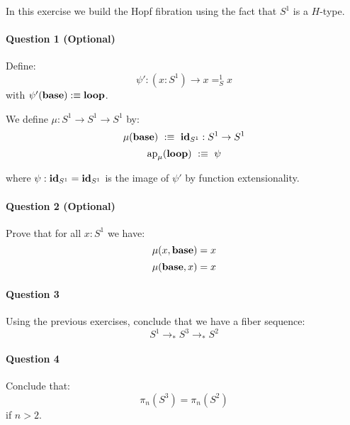\documentclass{article}[6pt]%
\renewcommand{\r}{\rightarrow}
\newcommand{\ap}{\mathrm{ap}}
\newcommand{\id}{\mathrm{\bf id}}
\newcommand{\base}{\mathrm{\bf base}}
\renewcommand{\loop}{\mathrm{\bf loop}}
\begin{document}
\begin{Exercise}[title={$S^1$ is a $H$-type}]

In this exercise we build the Hopf fibration using the fact that $S^1$ is a $H$-type.

\paragraph{Question 1 (Optional)} Define: 
\[\psi' : (x:S^1)\r x=_S^1x\]
with $\psi'(\base) :\equiv \loop$.

\vspace{0.4cm}

We define $\mu : S^1\r  S^1\r S^1$ by:
\[\mu(\base) \ :\equiv\ \id_{S^1} : S^1\r S^1\]
\[\ap_\mu(\loop) \ :\equiv\ \psi\]

where $\psi : \id_{S^1}=\id_{S^1}$ is the image of $\psi'$ by function extensionality.

\paragraph{Question 2 (Optional)}
Prove that for all $x:S^1$ we have:
\[\mu(x,\base) = x\]
\[\mu(\base,x) = x\]

\paragraph{Question 3} Using the previous exercises, conclude that we have a fiber sequence:
\[S^1\r_* S^3\r_* S^2\]

\paragraph{Question 4} Conclude that:
\[\pi_n(S^3) = \pi_n(S^2)\]
if $n>2$.

\end{Exercise}
\end{document}
